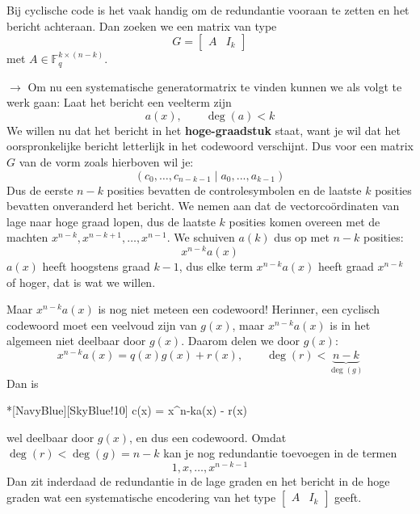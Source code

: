 Bij cyclische code is het vaak handig om de redundantie vooraan te zetten en het bericht achteraan. Dan zoeken we een matrix van type
\begin{equation*}
    G = \begin{bmatrix}
        A & I_k
    \end{bmatrix}
\end{equation*}
met $A \in \mathbb{F}_q^{k \times (n-k)}$. 

$\to$ Om nu een systematische generatormatrix te vinden kunnen we als volgt te werk gaan:
Laat het bericht een veelterm zijn
\begin{equation*}
    a(x), \qquad \deg(a) < k
\end{equation*}
We willen nu dat het bericht in het \textbf{hoge-graadstuk} staat, want je wil dat het oorspronkelijke bericht letterlijk in het codewoord verschijnt. Dus voor een matrix $G$ van de vorm zoals hierboven wil je:
\begin{equation*}
    (c_0, \dots, c_{n-k-1} \mid a_0, ..., a_{k-1})
\end{equation*}
Dus de eerste $n-k$ posities bevatten de controlesymbolen en de laatste $k$ posities bevatten onveranderd het bericht. We nemen aan dat de vectorcoördinaten van lage naar hoge graad lopen, dus de laatste $k$ posities komen overeen met de machten $x^{n-k},x^{n-k+1},\dots,x^{n-1}$.
We schuiven $a(k)$ dus op met $n-k$ posities:
\begin{equation*}
    x^{n-k}a(x)
\end{equation*}
$a(x)$ heeft hoogstens graad $k-1$, dus elke term $x^{n-k}a(x)$ heeft graad $x^{n-k}$ of hoger, dat is wat we willen.

Maar $x^{n-k}a(x)$ is nog niet meteen een codewoord! Herinner, een cyclisch codewoord moet een veelvoud zijn van $g(x)$, maar $x^{n-k}a(x)$ is in het algemeen niet deelbaar door $g(x)$. Daarom delen we door $g(x)$:
\begin{equation*}
    x^{n-k}a(x) = q(x)g(x) + r(x), \qquad \deg(r) < \underbrace{n-k}_{\deg(g)}
\end{equation*}
Dan is
\begin{equationbox}*[NavyBlue][SkyBlue!10]
    c(x) = x^{n-k}a(x) - r(x)
\end{equationbox}

wel deelbaar door $g(x)$, en dus een codewoord. Omdat $\deg(r) < \deg(g) = n-k$ kan je nog redundantie toevoegen in de termen
\begin{equation*}
    1, x, \dots, x^{n-k-1}
\end{equation*}
Dan zit inderdaad de redundantie in de lage graden en het bericht in de hoge graden wat een systematische encodering van het type $\begin{bmatrix}
    A & I_k
\end{bmatrix}$ geeft.

